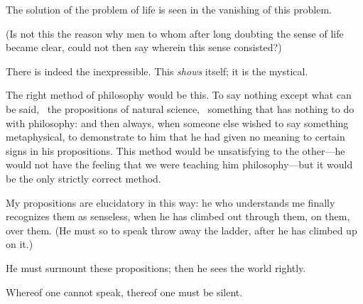 {The solution of the problem of life is seen in the
vanishing of this problem.

(Is not this the reason why men to whom
after long doubting the sense of life became
clear, could not then say wherein this sense
consisted?)}


{There is indeed the inexpressible. This \emph{shows}
itself; it is the mystical.}


{The right method of philosophy would be this.
To say nothing except what can be said, \idEst\ the
propositions of natural science, \idEst\ something that
has nothing to do with philosophy: and then
always, when someone else wished to say something
metaphysical, to demonstrate to him that he
had given no meaning to certain signs in his
propositions. This method would be unsatisfying
to the other---he would not have the feeling that
we were teaching him philosophy---but it would be
the only strictly correct method.}


{My propositions are elucidatory in this way:
he who understands me finally recognizes them as
senseless, when he has climbed out through them,
on them, over them. (He must so to speak throw
away the ladder, after he has climbed up on it.)

He must surmount these propositions; then he
sees the world rightly.}


{Whereof one cannot speak, thereof one must be
silent.}
